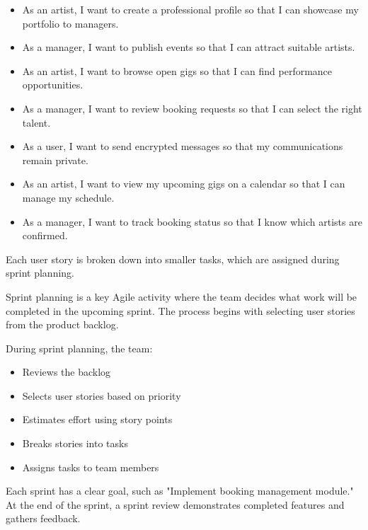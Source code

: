 \documentclass[12pt,a4paper]{report}
\begin{document}
\begin{itemize}
\item As an artist, I want to create a professional profile so that I can showcase my portfolio to managers.

\item As a manager, I want to publish events so that I can attract suitable artists.

\item As an artist, I want to browse open gigs so that I can find performance opportunities.

\item As a manager, I want to review booking requests so that I can select the right talent.

\item As a user, I want to send encrypted messages so that my communications remain private.

\item As an artist, I want to view my upcoming gigs on a calendar so that I can manage my schedule.

\item As a manager, I want to track booking status so that I know which artists are confirmed.
\end{itemize}

Each user story is broken down into smaller tasks, which are assigned during sprint planning.

Sprint planning is a key Agile activity where the team decides what work will be completed in the upcoming sprint. The process begins with selecting user stories from the product backlog.

During sprint planning, the team:
\begin{itemize}
\item Reviews the backlog

\item Selects user stories based on priority

\item Estimates effort using story points

\item Breaks stories into tasks

\item Assigns tasks to team members
\end{itemize}

Each sprint has a clear goal, such as "Implement booking management module." At the end of the sprint, a sprint review demonstrates completed features and gathers feedback.
\end{document}
